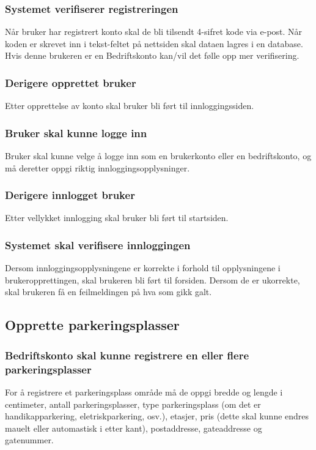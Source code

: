 \documentclass[12pt]{article}
\begin{document}
\subsubsection{Systemet verifiserer registreringen}
Når bruker har registrert konto skal de bli tilsendt 4-sifret kode via e-post. Når koden er skrevet inn i tekst-feltet på nettsiden skal dataen lagres i en database. Hvis denne brukeren er en Bedriftskonto kan/vil det følle opp mer verifisering.

\subsubsection{Derigere opprettet bruker}
Etter opprettelse av konto skal bruker bli ført til innloggingssiden.

\subsubsection{Bruker skal kunne logge inn}
Bruker skal kunne velge å logge inn som en brukerkonto eller en bedriftskonto, og må deretter oppgi riktig innloggingsopplysninger.

\subsubsection{Derigere innlogget bruker}
Etter vellykket innlogging skal bruker bli ført til startsiden.

\subsubsection{Systemet skal verifisere innloggingen}
Dersom innloggingsopplysningene er korrekte i forhold til opplysningene i brukeropprettingen, skal brukeren bli ført til forsiden. Dersom de er ukorrekte, skal brukeren få en feilmeldingen på hva som gikk galt.

\subsection{Opprette parkeringsplasser}

\subsubsection{Bedriftskonto skal kunne registrere en eller flere parkeringsplasser}
For å registrere et parkeringsplass område må de oppgi bredde og lengde i centimeter, antall parkeringsplasser, type parkeringsplass (om det er handikapparkering, eletriskparkering, osv.), etasjer, pris (dette skal kunne endres mauelt eller automastisk i etter kant), postaddresse, gateaddresse og gatenummer.
\end{document}
